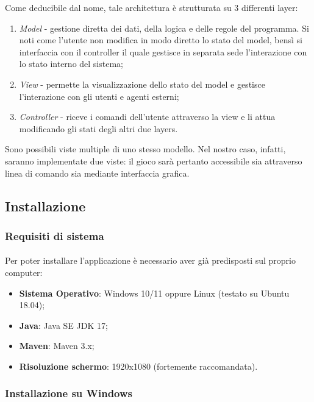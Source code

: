 \documentclass[a4paper, 12pt]{article}
\begin{document}
	Come deducibile dal nome, tale architettura è strutturata su 3 differenti layer:\\
	\begin{enumerate}
		\item \emph{Model} - gestione diretta dei dati, della logica e delle regole del programma. Si noti come l'utente non modifica in modo diretto lo stato del model, bensì si interfaccia con il controller il quale gestisce in separata sede l'interazione con lo stato interno del sistema;
		\item \emph{View} - permette la visualizzazione dello stato del model e gestisce l'interazione con gli utenti e agenti esterni; 
		\item \emph{Controller} - riceve i comandi dell'utente attraverso la view e li attua modificando gli stati degli altri due layers.
	\end{enumerate}
	Sono possibili viste multiple di uno stesso modello. Nel nostro caso, infatti, saranno implementate due viste: il gioco sarà pertanto accessibile sia attraverso linea di comando sia mediante interfaccia grafica.
	
	\subsection{Installazione}
	\subsubsection{Requisiti di sistema}
	\paragraph{}
	Per poter installare l'applicazione è necessario aver già predisposti sul proprio computer:
	\begin{itemize}
		\item \textbf{Sistema Operativo}: Windows 10/11 oppure Linux (testato su Ubuntu 18.04);
		\item \textbf{Java}: Java SE JDK 17;
		\item \textbf{Maven}: Maven 3.x;
		\item \textbf{Risoluzione schermo}: 1920x1080 (fortemente raccomandata).
	\end{itemize}
	\subsubsection{Installazione su Windows}
\end{document}
